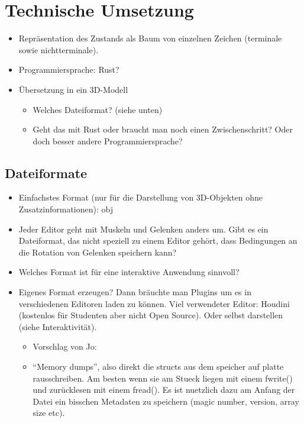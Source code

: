 \chapter{Technische Umsetzung}

\begin{itemize}
 \item Repräsentation des Zustands als Baum von einzelnen Zeichen (terminale sowie nichtterminale).
 \item Programmiersprache: Rust?
 \item Übersetzung in ein 3D-Modell
    \begin{itemize}
     \item Welches Dateiformat? (siehe unten)
     \item Geht das mit Rust oder braucht man noch einen Zwischenschritt? Oder doch besser andere Programmiersprache?
    \end{itemize}
\end{itemize}


\section{Dateiformate}

\begin{itemize}
 \item Einfachstes Format (nur für die Darstellung von 3D-Objekten ohne Zusatzinformationen): obj
 \item Jeder Editor geht mit Muskeln und Gelenken anders um. Gibt es ein Dateiformat, das nicht speziell zu einem Editor gehört, dass Bedingungen an die Rotation von Gelenken speichern kann?
 \item Welches Format ist für eine interaktive Anwendung sinnvoll?
 \item Eigenes Format erzeugen? Dann bräuchte man Plugins um es in verschiedenen Editoren laden zu können. Viel verwendeter Editor: Houdini (kostenlos für Studenten aber nicht Open Source). Oder selbst darstellen (siehe Interaktivität).
 \begin{itemize}
  \item Vorschlag von Jo:
  \item "`Memory dumps"', also direkt die structs aus dem speicher auf platte rausschreiben. Am besten wenn sie am Stueck liegen mit einem fwrite() und zurücklesen mit einem fread(). Es ist nuetzlich dazu am Anfang der Datei ein bisschen Metadaten zu speichern (magic number, version, array size etc).
 \end{itemize}

\end{itemize}


